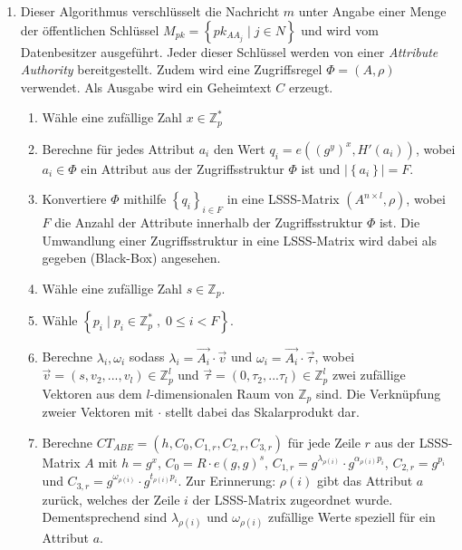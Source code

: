 \begin{enumerate}
	\item {} Dieser Algorithmus
		ver\-schlüs\-selt die Nachricht $m$ unter Angabe einer Menge der
		öffent\-lich\-en Schlüssel $M_{pk} = \left\{ pk_{AA_j} \;\vert\; j \in N
			\right\}$ und wird vom Datenbesitzer ausgeführt. Jeder dieser Schlüssel
			werden von einer \textit{Attribute Authority} bereitgestellt. Zudem wird
			eine Zugriffsregel $\Phi = \left( A, \rho \right)$ verwendet. Als Ausgabe
			wird ein Geheimtext $C$ erzeugt.
		\begin{enumerate}
			\item Wähle eine zufällige Zahl $x \in \mathbb{Z}^*_p$
			\item Berechne für jedes Attribut $a_i$ den Wert $q_i = e((g^y)^x, H'(a_i))$,
				wobei $a_i \in \Phi$ ein Attribut aus der Zugriffsstruktur $\Phi$ ist
				und $\lvert\left\{a_i\right\}\rvert = F$.
			\item Konvertiere $\Phi$ mithilfe $\left\{q_i\right\}_{i \in F}$ in eine
				LSSS-Matrix $\left( A^{n \times l}, \rho \right)$, wobei $F$ die Anzahl
				der Attribute innerhalb der Zugriffsstruktur $\Phi$ ist. Die Umwandlung
				einer Zugriffsstruktur in eine LSSS-Matrix wird dabei als gegeben
				(Black-Box) angesehen.
			\item Wähle eine zufällige Zahl $s \in \mathbb{Z}_p$.
			\item Wähle $\left\{ p_i \;\vert\; p_i \in \mathbb{Z}^*_p \;,\; 0 \leq i < F
				\right\}$.
			\item Berechne $\lambda_i, \omega_i$ sodass $\lambda_i = \vec{A_i} \cdot
				\vec{v}$ und $\omega_i = \vec{A_i} \cdot \vec{\tau}$, wobei $\vec{v} =
				\left( s, v_2, ..., v_l \right) \in \mathbb{Z}^l_p$ und $\vec{\tau} =
				\left( 0, \tau_2, ... \tau_l \right) \in \mathbb{Z}^l_p$ zwei zufällige
				Vektoren aus dem $l$-dimensionalen Raum von $\mathbb{Z}_p$ sind. Die
				Verknüpfung zweier Vektoren mit $\cdot$ stellt dabei das Skalarprodukt
				dar.
			\item Berechne $CT_{ABE} = \left(h, C_0, C_{1,r}, C_{2,r}, C_{3,r}\right)$
				für jede Zeile $r$ aus der LSSS-Matrix $A$ mit
				$h = g^x$,
				$C_0 = R \cdot e(g, g)^s$,
				$C_{1,r} = g^{\lambda_{\rho(i)}} \cdot g^{\alpha_{\rho(i)}p_i}$,
				$C_{2,r} = g^{p_i}$ und 
				$C_{3,r} = g^{\omega_{\rho(i)}} \cdot g^{t_{\rho(i)}p_i}$.
				Zur Erinnerung: $\rho(i)$ gibt das Attribut $a$
				zurück, welches der Zeile $i$ der LSSS-Matrix zugeordnet wurde.
				Dementsprechend sind $\lambda_{\rho(i)}$ und $\omega_{\rho(i)}$
				zufällige Werte speziell für ein Attribut $a$.

\end{enumerate}
\end{enumerate}
